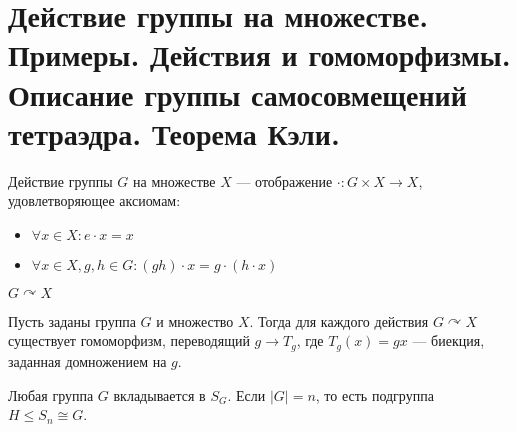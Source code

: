 % 
% 
\section{Действие группы на множестве. Примеры. Действия и гомоморфизмы. Описание группы самосовмещений тетраэдра. Теорема Кэли.}
\begin{defn}
    {\sf Действие группы $ G$ на множестве  $ X$} --- отображение $ \cdot \colon G \times X \to  X$, удовлетворяющее аксиомам:
    \begin{itemize}[noitemsep]
	\item $ \forall x \in X\colon e\cdot x = x$
	\item $ \forall x \in X, g, h \in G\colon (gh)\cdot x = g\cdot (h\cdot x)$
    \end{itemize}
    \begin{name}
        $ G \curvearrowright X$
    \end{name}
\end{defn}
\begin{thm}
    Пусть заданы группа $ G$ и множество  $ X$. Тогда для каждого действия  $ G \curvearrowright X$ существует гомоморфизм, переводящий  $ g \to T_g$, где $ T_g(x) = gx$ --- биекция, заданная домножением на  $ g$.
\end{thm}
\begin{thm}[Кэли]
    Любая группа $ G$ вкладывается в  $ S_G$. Если  $ \lvert G \rvert = n$, то есть подгруппа $ H \le S_{n} \cong G $.
\end{thm}
% 
